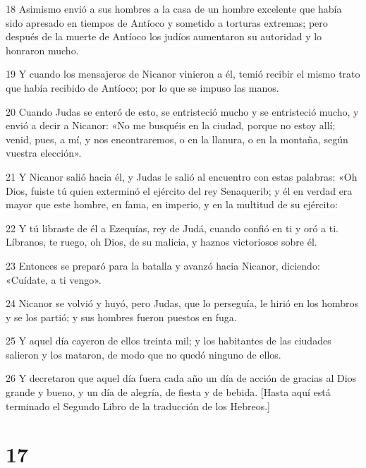 \par 18 Asimismo envió a sus hombres a la casa de un hombre excelente que había sido apresado en tiempos de Antíoco y sometido a torturas extremas; pero después de la muerte de Antíoco los judíos aumentaron su autoridad y lo honraron mucho.

\par 19 Y cuando los mensajeros de Nicanor vinieron a él, temió recibir el mismo trato que había recibido de Antíoco; por lo que se impuso las manos.

\par 20 Cuando Judas se enteró de esto, se entristeció mucho y se entristeció mucho, y envió a decir a Nicanor: «No me busquéis en la ciudad, porque no estoy allí; venid, pues, a mí, y nos encontraremos, o en la llanura, o en la montaña, según vuestra elección».

\par 21 Y Nicanor salió hacia él, y Judas le salió al encuentro con estas palabras: «Oh Dios, fuiste tú quien exterminó el ejército del rey Senaquerib; y él en verdad era mayor que este hombre, en fama, en imperio, y en la multitud de su ejército:

\par 22 Y tú libraste de él a Ezequías, rey de Judá, cuando confió en ti y oró a ti. Líbranos, te ruego, oh Dios, de su malicia, y haznos victoriosos sobre él.

\par 23 Entonces se preparó para la batalla y avanzó hacia Nicanor, diciendo: «Cuídate, a ti vengo».

\par 24 Nicanor se volvió y huyó, pero Judas, que lo perseguía, le hirió en los hombros y se los partió; y sus hombres fueron puestos en fuga.

\par 25 Y aquel día cayeron de ellos treinta mil; y los habitantes de las ciudades salieron y los mataron, de modo que no quedó ninguno de ellos.

\par 26 Y decretaron que aquel día fuera cada año un día de acción de gracias al Dios grande y bueno, y un día de alegría, de fiesta y de bebida. [Hasta aquí está terminado el Segundo Libro de la traducción de los Hebreos.]

\chapter{17}

